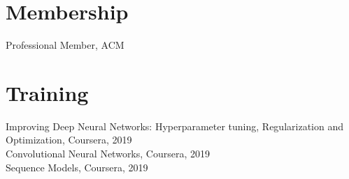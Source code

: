 \documentclass[]{deedy-resume-openfont}
\begin{document}
\begin{minipage}[t]{0.33\textwidth}
\section{Membership}
Professional Member, ACM \\
\sectionsep

\section{Training}
\textbullet{} Improving Deep Neural Networks: Hyperparameter tuning, Regularization and Optimization, Coursera, 2019\\
\textbullet{} Convolutional Neural Networks, Coursera, 2019\\
\textbullet{} Sequence Models, Coursera, 2019
\sectionsep


%
%

\end{minipage} 
\hfill
\end{document}
